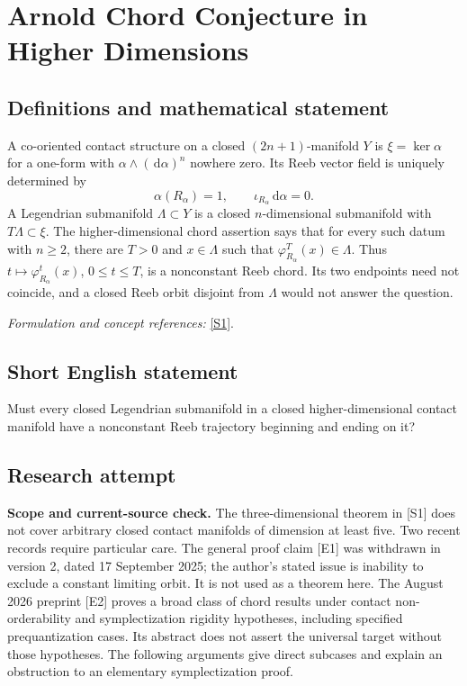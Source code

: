 \documentclass[11pt]{article}
\begin{document}
\section*{\texorpdfstring{Arnold Chord Conjecture in Higher Dimensions}{Arnold Chord Conjecture in Higher Dimensions}}\label{30006865}
\subsection{Definitions and mathematical statement}
A co-oriented contact structure on a closed $(2n+1)$-manifold $Y$ is $\xi=\ker\alpha$ for a one-form with $\alpha\wedge({\,\mathrm{d}}\alpha)^n$ nowhere zero. Its Reeb vector field is uniquely determined by
\[
 \alpha(R_\alpha)=1,\qquad \iota_{R_\alpha}{\,\mathrm{d}}\alpha=0.
\]
A Legendrian submanifold $\Lambda\subset Y$ is a closed $n$-dimensional submanifold with $T\Lambda\subset\xi$. The higher-dimensional chord assertion says that for every such datum with $n\ge2$, there are $T>0$ and $x\in\Lambda$ such that $\varphi_{R_\alpha}^T(x)\in\Lambda$. Thus $t\mapsto\varphi_{R_\alpha}^t(x)$, $0\le t\le T$, is a nonconstant Reeb chord. Its two endpoints need not coincide, and a closed Reeb orbit disjoint from $\Lambda$ would not answer the question.
\par\smallskip\textit{Formulation and concept references:} \href{https://arxiv.org/abs/1004.4319}{[S1]}.

\subsection{Short English statement}
Must every closed Legendrian submanifold in a closed higher-dimensional contact manifold have a nonconstant Reeb trajectory beginning and ending on it?
\subsection{Research attempt}
\textbf{Scope and current-source check.}
The three-dimensional theorem in [S1] does not cover arbitrary closed contact
manifolds of dimension at least five.  Two recent records require particular
care.  The general proof claim [E1] was withdrawn in version 2, dated
17 September 2025; the author's stated issue is inability to exclude a
constant limiting orbit.  It is not used as a theorem here.  The August 2026
preprint [E2] proves a broad class of chord results under contact
non-orderability and symplectization rigidity hypotheses, including specified
prequantization cases.  Its abstract does not assert the universal target
without those hypotheses.  The following arguments give direct subcases and
explain an obstruction to an elementary symplectization proof.
\end{document}
